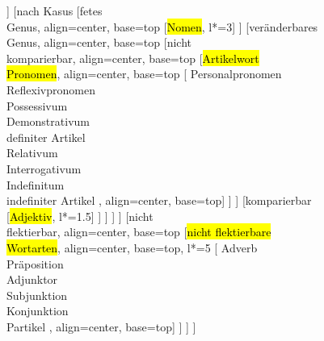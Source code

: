 \begin{figure}[H]
\centering

\begin{forest}
[\hl{Wortart}
	[flektierbar
		[nach Tempus
					[\hl{Verb}, l*=4]
		]
		[nach Kasus
			[fetes \\ Genus, align=center, base=top
					[\hl{Nomen}, l*=3]
			]
			[veränderbares \\ Genus, align=center, base=top
				[nicht \\ komparierbar, align=center, base=top
					[\hl{Artikelwort} \\ \hl{Pronomen}, align=center, base=top
						[
							Personalpronomen \\
							Reflexivpronomen \\
							Possessivum \\
							Demonstrativum \\
							definiter Artikel \\
							Relativum \\
							Interrogativum \\
							Indefinitum \\
							indefiniter Artikel
						, align=center, base=top]
					]
				]
				[komparierbar
					[\hl{Adjektiv}, l*=1.5]
				]
			]
		]
	]
	[nicht \\ flektierbar, align=center, base=top
					[\hl{nicht flektierbare} \\ \hl{Wortarten}, align=center, base=top, l*=5
						[
							Adverb \\
							Präposition \\
							Adjunktor \\
							Subjunktion \\
							Konjunktion \\
							Partikel
						, align=center, base=top]
					]
	]
]
\end{forest}


\end{figure}
